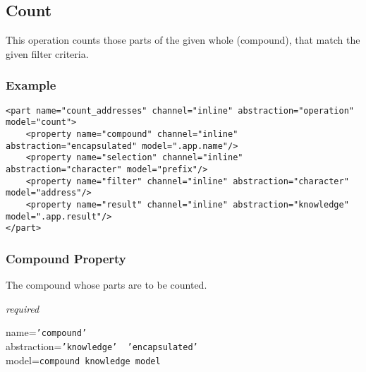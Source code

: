 %
%
%
%
%
%

\subsection{Count}
\label{count_heading}

This operation counts those parts of the given whole (compound), that match the
given filter criteria.

\subsubsection{Example}

\begin{scriptsize}
    \begin{verbatim}
<part name="count_addresses" channel="inline" abstraction="operation" model="count">
    <property name="compound" channel="inline" abstraction="encapsulated" model=".app.name"/>
    <property name="selection" channel="inline" abstraction="character" model="prefix"/>
    <property name="filter" channel="inline" abstraction="character" model="address"/>
    <property name="result" channel="inline" abstraction="knowledge" model=".app.result"/>
</part>
    \end{verbatim}
\end{scriptsize}

\subsubsection{Compound Property}

The compound whose parts are to be counted.

\emph{required}

name=\texttt{'compound'}\\
abstraction=\texttt{'knowledge' \vline\ 'encapsulated'}\\
model=\texttt{compound knowledge model}

